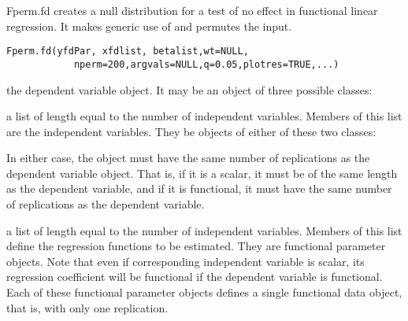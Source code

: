 \documentclass{article}
\begin{document}
\begin{Description}\relax
Fperm.fd creates a null distribution for a test of no effect in functional
linear regression. It makes generic use of  and permutes the
 input.
\end{Description}
\begin{Usage}
\begin{verbatim}
Fperm.fd(yfdPar, xfdlist, betalist,wt=NULL,
            nperm=200,argvals=NULL,q=0.05,plotres=TRUE,...)
\end{verbatim}
\end{Usage}
\begin{Arguments}
\begin{ldescription}
\item[\code{yfdPar}] the dependent variable object.  It may be an object of
three possible classes:

\item[\code{xfdlist}] a list of length equal to the number of independent variables. Members
of this list are the independent variables.  They be objects of either
of these two classes:


In either case, the object must have the same number of replications as
the dependent variable object.  That is, if it is a scalar, it must be
of the same length as the dependent variable, and if it is functional,
it must have the same number of replications as the dependent variable.

\item[\code{betalist}] a list of length equal to the number of independent variables. Members
of this list define the regression functions to be estimated.
They are functional parameter objects.  Note that even if corresponding
independent variable is scalar, its regression coefficient will be
functional if the dependent variable is functional.  Each of these
functional parameter objects defines a single functional data object,
that is, with only one replication.


\end{ldescription}
\end{Arguments}
\end{document}
